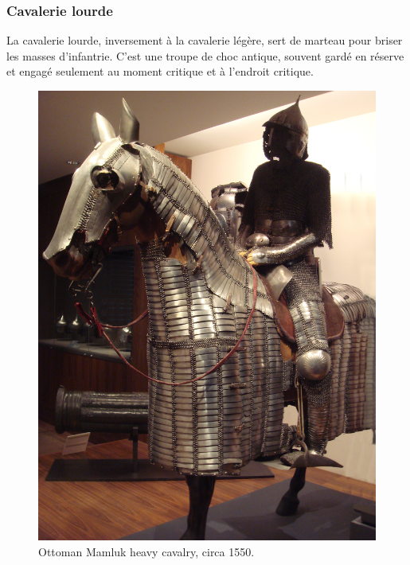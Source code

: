\documentclass{article}
\begin{document}
\subsubsection{Cavalerie lourde}
La cavalerie lourde, inversement à la cavalerie légère, sert de marteau pour briser les masses d'infantrie. C'est une \og{}troupe de choc\fg{} antique, souvent gardé en réserve et engagé seulement au moment critique et à l'endroit critique.
\begin{center}
\begin{figure}[H]
\hfill
\begin{minipage}[H]{0.4\linewidth}
	\centering
	\includegraphics[width=\linewidth]{../ressources/Ottoman_Mamluk_horseman}
	\caption{Ottoman Mamluk heavy cavalry, circa 1550. \cite{heavy_cavalry}}
\end{minipage}
\hfill
\begin{minipage}[H]{0.45\linewidth}
	\centering

\end{minipage}
\end{figure}
\end{center}
\end{document}
